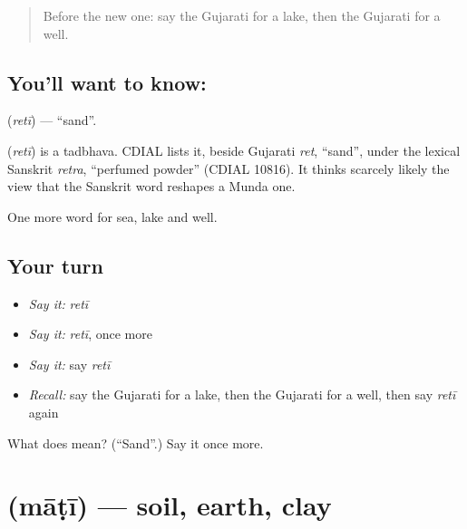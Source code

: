 \label{lesson:GU-C65-sand}



\begin{quote}
Before the new one: say the Gujarati for a lake, then the Gujarati for a well.
\end{quote}

\subsection*{You'll want to know: }
\textbf{} (\emph{retī}) — \textquotedblleft{}sand\textquotedblright{}.

\begin{cousinweb}
\textbf{} (\emph{retī}) is a tadbhava. CDIAL lists it, beside Gujarati \emph{ret}, \textquotedblleft{}sand\textquotedblright{}, under the lexical Sanskrit \emph{retra}, \textquotedblleft{}perfumed powder\textquotedblright{} (CDIAL 10816). It thinks scarcely likely the view that the Sanskrit word reshapes a Munda one.
\end{cousinweb}

\begin{grammarlens}[title={What you've built}]
One more word for sea, lake and well.
\end{grammarlens}

\subsection*{Your turn}
\begin{itemize}
\raggedright
  \item \emph{Say it:} \emph{retī}
  \item \emph{Say it:} \emph{retī}, once more
  \item \emph{Say it:} say \emph{retī}
  \item \emph{Recall:} say the Gujarati for a lake, then the Gujarati for a well, then say \emph{retī} again
\end{itemize}

\begin{tcolorbox}[breakable,colback=teal!4,colframe=teal!35!black,title={Before you move on}]
What does  mean? (\textquotedblleft{}Sand\textquotedblright{}.) Say it once more.
\end{tcolorbox}
\section[\texorpdfstring{\gu{માટી} (māṭī)}{માટી (māṭī)}]{ (māṭī) — soil, earth, clay}

